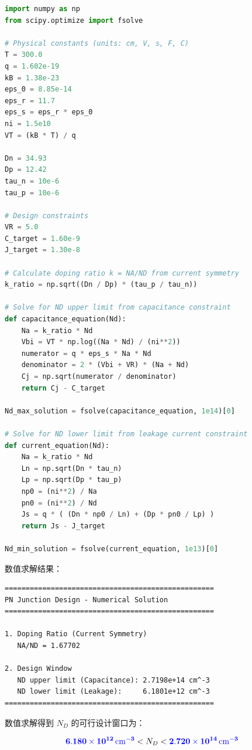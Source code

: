 \documentclass[12pt,a4paper]{article}
\begin{document}
\begin{lstlisting}[language=Python, caption={PN结参数数值求解程序（第一部分：设计窗口计算）}]
import numpy as np
from scipy.optimize import fsolve

# Physical constants (units: cm, V, s, F, C)
T = 300.0
q = 1.602e-19
kB = 1.38e-23
eps_0 = 8.85e-14
eps_r = 11.7
eps_s = eps_r * eps_0
ni = 1.5e10
VT = (kB * T) / q

Dn = 34.93
Dp = 12.42
tau_n = 10e-6
tau_p = 10e-6

# Design constraints
VR = 5.0
C_target = 1.60e-9
J_target = 1.30e-8

# Calculate doping ratio k = NA/ND from current symmetry
k_ratio = np.sqrt((Dn / Dp) * (tau_p / tau_n))

# Solve for ND upper limit from capacitance constraint
def capacitance_equation(Nd):
    Na = k_ratio * Nd
    Vbi = VT * np.log((Na * Nd) / (ni**2))
    numerator = q * eps_s * Na * Nd
    denominator = 2 * (Vbi + VR) * (Na + Nd)
    Cj = np.sqrt(numerator / denominator)
    return Cj - C_target

Nd_max_solution = fsolve(capacitance_equation, 1e14)[0]

# Solve for ND lower limit from leakage current constraint
def current_equation(Nd):
    Na = k_ratio * Nd
    Ln = np.sqrt(Dn * tau_n)
    Lp = np.sqrt(Dp * tau_p)
    np0 = (ni**2) / Na
    pn0 = (ni**2) / Nd
    Js = q * ( (Dn * np0 / Ln) + (Dp * pn0 / Lp) )
    return Js - J_target

Nd_min_solution = fsolve(current_equation, 1e13)[0]
\end{lstlisting}

{\heiti 数值求解结果：}

\begin{lstlisting}[caption={数值计算输出结果}]
==================================================
PN Junction Design - Numerical Solution
==================================================

1. Doping Ratio (Current Symmetry)
   NA/ND = 1.67702

2. Design Window
   ND upper limit (Capacitance): 2.7198e+14 cm^-3
   ND lower limit (Leakage):     6.1801e+12 cm^-3
==================================================
\end{lstlisting}

数值求解得到 $N_D$ 的可行设计窗口为：

\begin{equation}
\textcolor{blue}{\mathbf{6.180 \times 10^{12}\,\text{cm}^{-3}}} < N_D < \textcolor{blue}{\mathbf{2.720 \times 10^{14}\,\text{cm}^{-3}}}
\end{equation}
\end{document}
